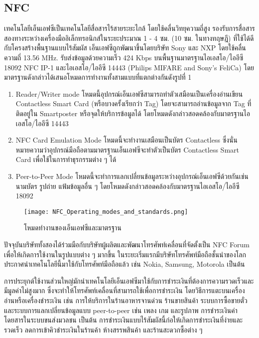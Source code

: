 \documentclass[a4paper]{article}
\begin{document}
\subsection{NFC}
เทคโนโลยีเอ็นเอฟซีเป็นเทคโนโลยีสื่อสารไร้สายระยะไกล้ โดยใช้คลื่นวิทยุความถี่สูง รองรับการสื่อสารสองทางระหว่างเครื่องมืออิเล็กทรอนิกส์ในระยะประมาณ 1 - 4 ซม. (10 ซม. ในทางทฤษฎี) ที่ใช้ได้ดีกับโครงสร้างพื้นฐานแบบไร้สัมผัส เอ็นเอฟซีถูกพัฒนาขึ้นโดยบริษัท Sony และ NXP โดยใช้คลื่นความถี่ 13.56 MHz. รับส่งข้อมูลด้วยความเร็ว 424 Kbps บนพื้นฐานมาตรฐานไอเอสโอ/ไออีซี 18092 NFC IP-1 และไอเอสโอ/ไออีซี 14443 (Philips MIFARE and Sony’s FeliCa) โดยมาตรฐานดังกล่าวได้เสนอโหมดการทำงานทั้งสามแบบที่แตกต่างกันดังรูปที่ 1 

\begin{enumerate}
  \item Reader/Writer mode โหมดนี้อุปกรณ์เอ็นเอฟซีสามารถทำตัวเสมือนเป็นเครื่องอ่านเขียน Contactless Smart Card (หรือบางครั้งเรียกว่า Tag) โดยจะสามารถอ่านข้อมูลจาก Tag ที่ติดอยู่ใน Smartposter หรือจุดให้บริการข้อมูลได้ โดยโหมดดังกล่าวสอดคล้องกับมาตรฐานไอเอสโอ/ไออีซี 14443
  \item  NFC Card Emulation Mode โหมดนี้จะทำงานเสมือนเป็นบัตร Contactless ซึ่งนั่นหมายความว่าอุปกรณ์มือถือตามมาตรฐานเอ็นเอฟซีจะทำตัวเป็นบัตร Contactless Smart Card เพื่อใช้ในการทำธุรกรรมต่าง ๆ ได้
  \item Peer-to-Peer Mode โหมดนี้จะทำการแลกเปลี่ยนข้อมูลระหว่างอุปกรณ์เอ็นเอฟซีด้วยกันเช่นนามบัตร รูปถ่าย แฟ้มข้อมูลอื่น ๆ โดยโหมดดังกล่าวสอดคล้องกับมาตรฐานไอเอสโอ/ไออีซี 18092
\end{enumerate}

\begin{figure}[ht!]
\centering
\texttt{[image: NFC\_Operating\_modes\_and\_standards.png]}
\caption{โหมดทำงานของเอ็นเอฟซีและมาตรฐาน}
\label{overflow}
\end{figure}

ปัจจุบันบริษัททั้งสองได้ร่วมมือกับบริษัทผู้ผลิตและพัฒนาโทรศัพท์เคลื่อนที่จัดตั้งเป็น NFC Forum เพื่อให้เกิดการใช้งานในรูปแบบต่าง ๆ มากขึ้น ในระยะเริ่มแรกมีบริษัทโทรศัพท์มือถือชั้นนำของโลกประกาศนำเทคโนโลยีนี้มาใช้กับโทรศัพท์มือถือแล้ว เช่น Nokia, Samsung, Motorola เป็นต้น

การประยุกต์ใช้งานส่วนใหญ่มักนำเทคโนโลยีเอ็นเอฟซีมาใช้กับการชำระเงินที่ต้องการความรวดเร็วและมีมูลค่าไม่สูงมาก ซึ่งจะทำให้โทรศัพท์เคลื่อนที่สามารถใช้เพื่อการชำระเงิน โดยวิธีการแตะบนเครื่องอ่านหรือเครื่องชำระเงิน เช่น การให้บริการในร้านอาหารจานด่วน ร้านขายสินค้า ระบบการซื้อขายตั๋ว และระบบการแลกเปลี่ยนข้อมูลแบบ peer-to-peer เช่น เพลง เกม และรูปภาพ การชำระเงินค่าโดยสารในระบบขนส่งมวลชน เป็นต้น การชำระเงินแบบไร้สัมผัสนี้ก่อให้เกิดการชำระเงินที่ง่ายและรวดเร็ว ลดการเข้าคิวชำระเงินในร้านค้า ห้างสรรพสินค้า และร้านสะดวกซื้อต่าง ๆ
\end{document}
